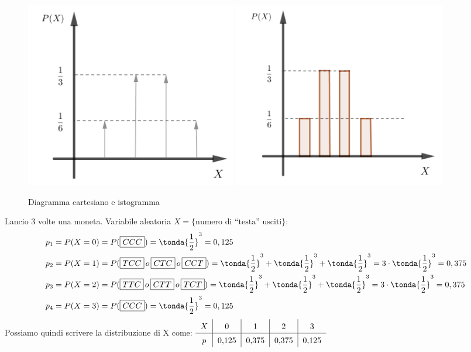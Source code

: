 \begin{figure}[htpb!]
  \centering
  \includegraphics[width=0.45\textwidth]{img/diagramma.png}
  \includegraphics[width=0.45\textwidth]{img/istogramma.png}
  \caption{Diagramma cartesiano e istogramma}
\end{figure}

\begin{esempio} Lancio 3 volte una moneta. Variabile aleatoria $X = \{\text{numero di ``testa'' usciti}\}$:
\[\begin{split}p_1 &= P(X=0) = P(\text{\boxed{CCC}}) = \tonda{\dfrac{1}{2}}^3 = 0,125 \\
p_2 &= P(X=1) = P(\text{\boxed{TCC}}\, o\, \text{\boxed{CTC}} \, o\, \text{\boxed{CCT}}) = \tonda{\dfrac{1}{2}}^3 + \tonda{\dfrac{1}{2}}^3 + \tonda{\dfrac{1}{2}}^3= 3\cdot \tonda{\dfrac{1}{2}}^3 = 0,375 \\
p_3 &= P(X=2) = P(\text{\boxed{TTC}} \, o\, \text{\boxed{CTT}}\, o\, \text{\boxed{TCT}}) = \tonda{\dfrac{1}{2}}^3 + \tonda{\dfrac{1}{2}}^3 + \tonda{\dfrac{1}{2}}^3= 3 \cdot \tonda{\dfrac{1}{2}}^3 = 0,375 \\
p_4 &= P(X=3) = P(\text{\boxed{CCC}}) = \tonda{\dfrac{1}{2}}^3 = 0,125 \\
 \end{split}\]
 Possiamo quindi scrivere la distribuzione di X come: \quad \(\renewcommand\arraystretch{1.4}
\setlength\arraycolsep{25pt}
\begin{tabular}{c|c|c|c|c}
$X$ & 0 & 1 & 2 & 3\\
\hline
$p$ & 0,125 & 0,375 & 0,375 & 0,125\\
\end{tabular}\)
\end{esempio}

